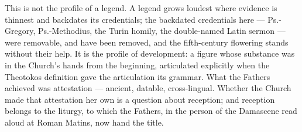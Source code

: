 This is not the profile of a legend. A legend grows loudest where
evidence is thinnest and backdates its credentials; the backdated
credentials here --- Ps.-Gregory, Ps.-Methodius, the Turin homily,
the double-named Latin sermon --- were removable, and have been
removed, and the fifth-century flowering stands without their help. It is the profile of development: a figure whose substance was
in the Church's hands from the beginning, articulated explicitly when
the Theotokos definition gave the articulation its grammar. What the
Fathers achieved was attestation --- ancient, datable, cross-lingual.
Whether the Church made that attestation her own is a question about
reception; and reception belongs to the liturgy, to which the
Fathers, in the person of the Damascene read aloud at Roman Matins,
now hand the title.
